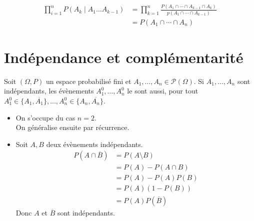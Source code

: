 \documentclass[../main.tex]{subfiles}
\begin{document}
\begin{align*}
    \prod_{i=1}^{n} P(A_k\mid A_1\ldots A_{k-1}) &= \prod_{k=1}^{n} \frac{P(A_1 \cap \cdots \cap A_{k-1}\cap A_k)}{p(A_1\cap \cdots\cap A_{k-1})} \\
    &= P(A_1\cap \cdots \cap A_n)
\end{align*}

\section{Indépendance et complémentarité}
\begin{tcolorbox}[title=Théorème 32.43, title filled=false, colframe=orange, colback=orange!10!white]
    Soit $(\Omega, P)$ un espace probabilisé fini et $A_1, \ldots, A_n\in \mathcal{P}(\Omega)$. Si $A_1, \ldots, A_n$ sont indépendants, les évènements $A_1^0, \ldots, A_n^0$ le sont aussi, pour tout $A_1^0\in \{A_1, \overline{A_1}\}, \ldots, A_n^0\in \{A_n, \overline{A_n}\}$. 
\end{tcolorbox}

\begin{itemize}
    \item On s'occupe du cas $n=2$. \\
    On généralise ensuite par récurrence. 
    \item Soit $A, B$ deux évènements indépendants. \\
    \begin{align*}
        P(A\cap \overline{B}) &= P(A\setminus B) \\
        &= P(A) - P(A\cap B) \\
        &= P(A) - P(A)P(B) \\
        &= P(A)(1 - P(B)) \\
        &= P(A)P(\overline{B})
    \end{align*}
    Donc $A$ et $\overline{B}$ sont indépendants. 
\end{itemize}
\end{document}
